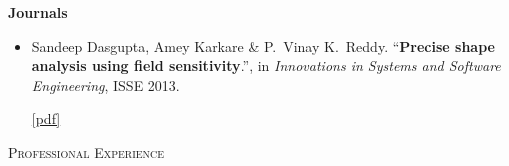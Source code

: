 \documentclass[9pt]{article}
\newenvironment{changemargin}[2]{%
  \begin{list}{}{%
    \setlength{\topsep}{0pt}%
    \setlength{\leftmargin}{#1}%
    \setlength{\rightmargin}{#2}%
    \setlength{\listparindent}{\parindent}%
    \setlength{\itemindent}{\parindent}%
    \setlength{\parsep}{\parskip}%
  }%
  \item[]}{\end{list}
}
\newcommand{\lineover}{
	\begin{changemargin}{-0.05in}{-0.05in}
		\vspace*{-8pt}
		\hrulefill \\
		\vspace*{-2pt}
	\end{changemargin}
}
\newcommand{\header}[1]{
	\begin{changemargin}{-0.5in}{-0.5in}
		\scshape{#1}\\
  	\lineover
	\end{changemargin}
}
\newcommand{\cmnt}[1]{}
\newenvironment{body} {
	\vspace*{-16pt}
	\begin{changemargin}{-0.25in}{-0.5in}
  }	
	{\end{changemargin}
}
\begin{document}
\begin{body}
\textbf{Journals}\\
	\vspace{-4pt}
	\begin{itemize} \itemsep -0pt
		\item  Sandeep Dasgupta, Amey Karkare \& P.\ Vinay K.\ Reddy. ``\textbf{Precise shape analysis using field sensitivity}.'', in \emph{Innovations in Systems and Software Engineering}, ISSE 2013.
                 \cmnt{ doi: \href{http://www.springerlink.com/openurl.asp?genre=article&id=doi:10.1007/s11334-013-0198-7}{10.1007/s11334-013-0198-7}. }
                 \href{http://webhost.engr.illinois.edu/~sdasgup3/Document/publication_isse.pdf}{[pdf]}
	\end{itemize}
\end{body}

\header{Professional Experience}
\end{document}

